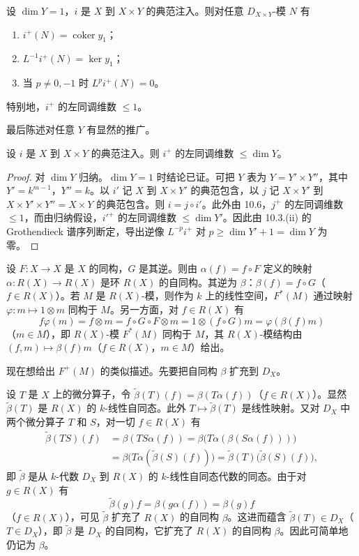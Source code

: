 \begin{lemma}
设 $\dim Y=1$，$i$ 是 $X$ 到 $X\times Y$ 的典范注入。则对任意 $D_{X\times Y}$-模 $N$ 有
\begin{enumerate}[label=(\roman*)]
  \item $i^+(N)=\operatorname{coker}y_1$；
  \item $L^{-1}i^+(N)=\ker y_1$；
  \item 当 $p\neq 0,-1$ 时 $L^pi^+(N)=0$。
\end{enumerate}
特别地，$i^+$ 的左同调维数 $\le 1$。
\end{lemma}

最后陈述对任意 $Y$ 有显然的推广。

\begin{lemma}
设 $i$ 是 $X$ 到 $X\times Y$ 的典范注入。则 $i^+$ 的左同调维数 $\le\dim Y$。
\end{lemma}

\begin{proof}
对 $\dim Y$ 归纳。$\dim Y=1$ 时结论已证。可把 $Y$ 表为 $Y=Y'\times Y''$，其中 $Y'=k^{m-1}$，$Y''=k$。以 $i'$ 记 $X$ 到 $X\times Y'$ 的典范包含，以 $j$ 记 $X\times Y'$ 到 $X\times Y'\times Y''=X\times Y$ 的典范包含。则 $i=j\circ i'$。此外由 10.6，$j^+$ 的左同调维数 $\le 1$，而由归纳假设，$i'^+$ 的左同调维数 $\le\dim Y'$。因此由 10.3.(ii) 的 Grothendieck 谱序列断定，导出逆像 $L^{-p}i^+$ 对 $p\ge\dim Y'+1=\dim Y$ 为零。
\end{proof}

设 $F:X\longrightarrow X$ 是 $X$ 的同构，$G$ 是其逆。则由 $\alpha(f)=f\circ F$ 定义的映射 $\alpha:R(X)\to R(X)$ 是环 $R(X)$ 的自同构。其逆为 $\beta$：$\beta(f)=f\circ G$（$f\in R(X)$）。若 $M$ 是 $R(X)$-模，则作为 $k$ 上的线性空间，$F^*(M)$ 通过映射 $\varphi:m\longmapsto1\otimes m$ 同构于 $M$。另一方面，对 $f\in R(X)$ 有
$$f\varphi(m)=f\otimes m=f\circ G\circ F\otimes m=1\otimes(f\circ G)m=\varphi(\beta(f)m)$$
（$m\in M$），即 $R(X)$-模 $F^*(M)$ 同构于 $M$，其 $R(X)$-模结构由 $(f,m)\longmapsto\beta(f)m$（$f\in R(X)$，$m\in M$）给出。

现在想给出 $F^+(M)$ 的类似描述。先要把自同构 $\beta$ 扩充到 $D_X$。

设 $T$ 是 $X$ 上的微分算子，令 $\tilde\beta(T)(f)=\beta(T\alpha(f))$（$f\in R(X)$）。显然 $\tilde\beta(T)$ 是 $R(X)$ 的 $k$-线性自同态。此外 $T\longmapsto\tilde\beta(T)$ 是线性映射。又对 $D_X$ 中两个微分算子 $T$ 和 $S$，对一切 $f\in R(X)$ 有
\begin{align*}
\tilde\beta(TS)(f)&=\beta(TS\alpha(f))=\beta\bigl(T\alpha(\beta(S\alpha(f)))\bigr)\\
&=\beta\bigl(T\alpha(\tilde\beta(S)(f))\bigr)=\tilde\beta(T)\bigl(\tilde\beta(S)(f)\bigr),
\end{align*}
即 $\tilde\beta$ 是从 $k$-代数 $D_X$ 到 $R(X)$ 的 $k$-线性自同态代数的同态。由于对 $g\in R(X)$ 有
$$\tilde\beta(g)f=\beta(g\alpha(f))=\beta(g)f$$
（$f\in R(X)$），可见 $\tilde\beta$ 扩充了 $R(X)$ 的自同构 $\beta$。这进而蕴含 $\tilde\beta(T)\in D_X$（$T\in D_X$），即 $\tilde\beta$ 是 $D_X$ 的自同构，它扩充了 $R(X)$ 的自同构 $\beta$。因此可简单地仍记为 $\beta$。

